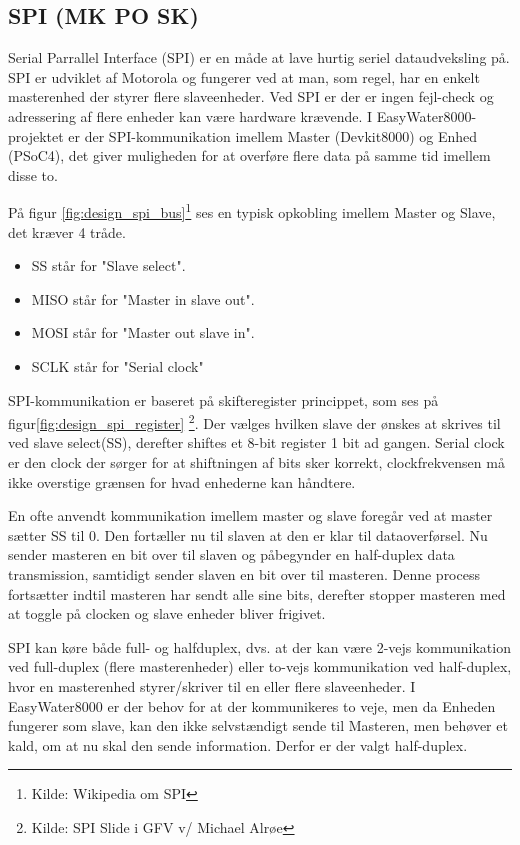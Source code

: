 \subsection{SPI (MK PO SK)}

Serial Parrallel Interface (SPI) er en måde at lave hurtig seriel dataudveksling på. SPI er udviklet af Motorola og fungerer ved at man, som regel, har en enkelt masterenhed der styrer flere slaveenheder. Ved SPI er der er ingen fejl-check og adressering af flere enheder kan være hardware krævende. I EasyWater8000-projektet er der SPI-kommunikation imellem Master (Devkit8000) og Enhed (PSoC4), det giver muligheden for at overføre flere data på samme tid imellem disse to.


På figur \ref{fig:design_spi_bus}\footnote{Kilde: Wikipedia om SPI} ses en typisk opkobling imellem Master og Slave, det kræver 4 tråde.

\begin{itemize}
 	\item SS står for "Slave select".
 	\item MISO står for "Master in slave out".
 	\item MOSI står for "Master out slave in". 
	\item SCLK står for "Serial clock" 
\end{itemize}

SPI-kommunikation er baseret på skifteregister princippet, som ses på figur\ref{fig:design_spi_register} \footnote{Kilde: SPI Slide i GFV v/ Michael Alrøe}. Der vælges hvilken slave der ønskes at skrives til ved slave select(SS), derefter shiftes et 8-bit register 1 bit ad gangen. Serial clock er den clock der sørger for at shiftningen af bits sker korrekt, clockfrekvensen må ikke overstige grænsen for hvad enhederne kan håndtere.


En ofte anvendt kommunikation imellem master og slave foregår ved at master sætter SS til 0. Den fortæller nu til slaven at den er klar til 
dataoverførsel. Nu sender masteren en bit over til slaven og påbegynder en half-duplex data transmission, samtidigt sender slaven en bit over til masteren. Denne process fortsætter indtil masteren har sendt alle sine bits, derefter stopper masteren med at toggle på clocken og slave enheder bliver frigivet.

SPI kan køre både full- og halfduplex, dvs. at der kan være 2-vejs kommunikation ved full-duplex (flere masterenheder) eller to-vejs kommunikation ved half-duplex, hvor en masterenhed styrer/skriver til en eller flere slaveenheder. I EasyWater8000 er der behov for at der kommunikeres to veje, men da Enheden fungerer som slave, kan den ikke selvstændigt sende til Masteren, men behøver et kald, om at nu skal den sende information. Derfor er der valgt half-duplex.
